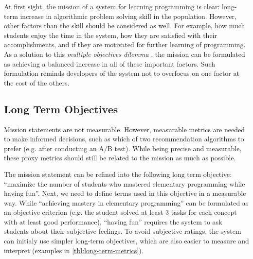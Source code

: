 At first sight, the mission of a system for learning programming is clear:
  long-term increase in algorithmic problem solving skill in the population.
However, other factors than the skill should be considered as well.
For example, how much students enjoy the time in the system,
  how they are satisfied with their accomplishments,
  and if they are motivated for further learning of programming.
As a solution to this \emph{multiple objectives dilemma} \cite[][Rule 39]{google-ml-rules},
  the mission can be formulated as achieving a balanced increase in all
  of these important factors.
Such formulation reminds developers of the system not to overfocus on one factor
  at the cost of the others.


\subsection{Long Term Objectives}
\label{sec:long-term-objectives}


Mission statements are not measurable.
However, measurable metrics are needed to make informed decisions,
such as which of two recommendation algorithms to prefer
(e.g. after conducting an A/B test). %
While being precise and measurable, these proxy metrics
should still be related to the mission as much as possible.

The mission statement can be refined into the following
  long term objective: ``maximize the number of students
  who mastered elementary programming while having fun''.  %
Next, we need to define terms used in this objective in a measurable way.
While ``achieving mastery in elementary programming'' can be
  formulated as an objective criterion
  (e.g. the student solved at least 3 tasks for each concept with at least good performance),
  ``having fun'' requires the system to ask students about their subjective feelings.
To avoid subjective ratings, the system can initialy use simpler long-term objectives,
which are also easier to measure and interpret
(examples in \cref{tbl:long-term-metrics}).

